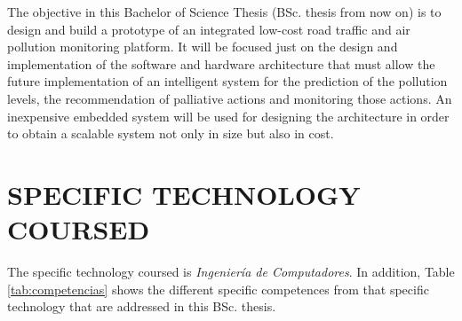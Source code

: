 \documentclass{pre-tfg}
\begin{document}
The objective in this Bachelor of Science Thesis (BSc. thesis from now on) is to design and build a prototype of an integrated low-cost road traffic and air pollution monitoring platform. It will be focused just on the design and implementation of the software and hardware architecture that must allow the future implementation of an intelligent system for the prediction of the pollution levels, the recommendation of palliative actions and monitoring those actions. An inexpensive embedded system will be used for designing the architecture in order to obtain a scalable system not only in size but also in cost.



\section{SPECIFIC TECHNOLOGY COURSED}

The specific technology coursed is \emph{Ingeniería de Computadores}. In addition, Table \ref{tab:competencias} shows the different specific competences from that specific technology that are addressed in this BSc. thesis. 
\end{document}
